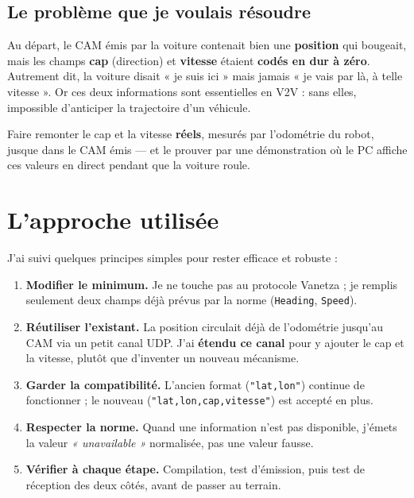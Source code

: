 \documentclass[a4paper,11pt]{article}
\newcommand{\code}[1]{\texttt{#1}}
\begin{document}
\subsection{Le problème que je voulais résoudre}
Au départ, le CAM émis par la voiture contenait bien une \textbf{position} qui bougeait, mais
les champs \textbf{cap} (direction) et \textbf{vitesse} étaient \textbf{codés en dur à zéro}.
Autrement dit, la voiture disait « je suis ici » mais jamais « je vais par là, à telle
vitesse ». Or ces deux informations sont essentielles en V2V : sans elles, impossible
d'anticiper la trajectoire d'un véhicule.

\begin{note}[Ma contribution]
Faire remonter le cap et la vitesse \textbf{réels}, mesurés par l'odométrie du robot, jusque
dans le CAM émis --- et le prouver par une démonstration où le PC affiche ces valeurs en
direct pendant que la voiture roule.
\end{note}

\section{L'approche utilisée}
J'ai suivi quelques principes simples pour rester efficace et robuste :

\begin{enumerate}[leftmargin=1.6em]
  \item \textbf{Modifier le minimum.} Je ne touche pas au protocole Vanetza ; je remplis
        seulement deux champs déjà prévus par la norme (\code{Heading}, \code{Speed}).
  \item \textbf{Réutiliser l'existant.} La position circulait déjà de l'odométrie jusqu'au CAM
        via un petit canal UDP. J'ai \textbf{étendu ce canal} pour y ajouter le cap et la
        vitesse, plutôt que d'inventer un nouveau mécanisme.
  \item \textbf{Garder la compatibilité.} L'ancien format (\code{"lat,lon"}) continue de
        fonctionner ; le nouveau (\code{"lat,lon,cap,vitesse"}) est accepté en plus.
  \item \textbf{Respecter la norme.} Quand une information n'est pas disponible, j'émets la
        valeur \emph{« unavailable »} normalisée, pas une valeur fausse.
  \item \textbf{Vérifier à chaque étape.} Compilation, test d'émission, puis test de réception
        des deux côtés, avant de passer au terrain.
\end{enumerate}
\end{document}

